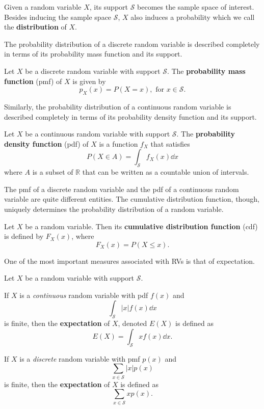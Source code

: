 Given a random variable $X$, its support $\mathcal S$ becomes the sample space of interest. Besides inducing the sample space $\mathcal S$, $X$ also induces a probability which we call the \textbf{distribution} of $X$.

The probability distribution of a discrete random variable is described completely in terms of its probability mass function and its support.

\begin{definition}[pmf]
	Let $X$ be a discrete random variable with support $\mathcal S$. The \textbf{probability mass function} (pmf) of $X$ is given by
$$p_X(x) = P(X = x),\text{ for }x \in \mathcal S.$$
\end{definition}

Similarly, the probability distribution of a continuous random variable is described completely in terms of its probability density function and its support.

\begin{definition}[pdf]
	Let $X$ be a continuous random variable with support $\mathcal S$. The \textbf{probability density function} (pdf) of $X$ is a function $f_X$ that satisfies
$$P(X\in A)=\int_\mathcal Sf_X(x)\dd x$$
where $A$ is a subset of $\mathbb R$ that can be written as a countable union of intervals.
\end{definition}

The pmf of a discrete random variable and the pdf of a continuous random variable are quite different entities. The cumulative distribution function, though, uniquely determines the probability distribution of a random variable.

\begin{definition}[cdf]
	Let $X$ be a random variable. Then its \textbf{cumulative distribution function} (cdf) is defined by $F_X(x)$, where
$$F_X(x)=P(X\leq x).$$
\end{definition}

One of the most important measures associated with RVs is that of expectation.

\begin{definition}[expectation]
	Let $X$ be a random variable with support $\mathcal S$.

	If $X$ is a \textit{continuous} random variable with pdf $f(x)$ and
	$$\int_{\mathcal S}|x|f(x)\dd x$$
	is finite, then the \textbf{expectation} of $X$, denoted $E(X)$ is defined as
	$$E(X)=\int_{\mathcal S} xf(x)\dd x.$$ 

	If $X$ is a \textit{discrete} random variable with pmf $p(x)$ and
	$$\sum_{x\in\mathcal S}|x|p(x)$$
	is finite, then the \textbf{expectation} of $X$ is defined as
	$$\sum_{x\in\mathcal S}xp(x).$$
\end{definition}

